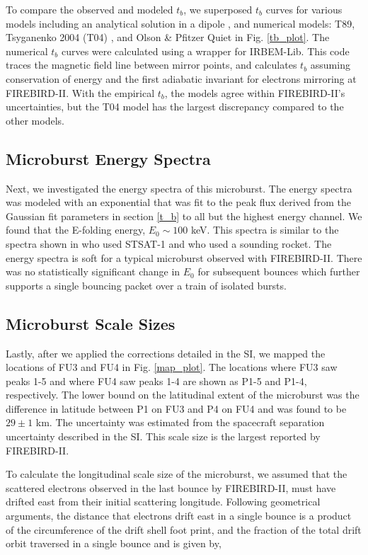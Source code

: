 \documentclass[draft, linenumbers]{agujournal}
\begin{document}
To compare the observed and modeled $t_b$, we superposed $t_b$ curves for various models including an analytical solution in a dipole \citep{Schulz1974}, and numerical models: T89, Tsyganenko 2004 (T04) \citep{Tsyganenko2005}, and Olson \& Pfitzer Quiet \citep{Olson1982} in Fig. \ref{tb_plot}. The numerical $t_b$ curves were calculated using a wrapper for IRBEM-Lib. This code traces the magnetic field line between mirror points, and calculates $t_b$ assuming conservation of energy and the first adiabatic invariant for electrons mirroring at FIREBIRD-II. With the empirical $t_b$, the models agree within FIREBIRD-II's uncertainties, but the T04 model has the largest discrepancy compared to the other models.

\subsection{Microburst Energy Spectra}
Next, we investigated the energy spectra of this microburst. The energy spectra was modeled with an exponential that was fit to the peak flux derived from the Gaussian fit parameters in section \ref{t_b} to all but the highest energy channel. We found that the E-folding energy, $E_0 \sim 100$ keV. This spectra is similar to the spectra shown in \citet{Lee2005} who used STSAT-1 and \citet{Datta1997} who used a sounding rocket. The energy spectra is soft for a typical microburst observed with FIREBIRD-II. There was no statistically significant change in $E_0$ for subsequent bounces which further supports a single bouncing packet over a train of isolated bursts.

\subsection{Microburst Scale Sizes} \label{scale_size} %
Lastly, after we applied the corrections detailed in the SI, we mapped the locations of FU3 and FU4 in Fig. \ref{map_plot}. The locations where FU3 saw peaks 1-5 and where FU4 saw peaks 1-4 are shown as P1-5 and P1-4, respectively. The lower bound on the latitudinal extent of the microburst was the difference in latitude between P1 on FU3 and P4 on FU4 and was found to be $29 \pm 1$ km. The uncertainty was estimated from the spacecraft separation uncertainty described in the SI. This scale size is the largest reported by FIREBIRD-II.

To calculate the longitudinal scale size of the microburst, we assumed that the scattered electrons observed in the last bounce by FIREBIRD-II, must have drifted east from their initial scattering longitude. Following geometrical arguments, the distance that electrons drift east in a single bounce is a product of the circumference of the drift shell foot print, and the fraction of the total drift orbit traversed in a single bounce and is given by, 
\end{document}
